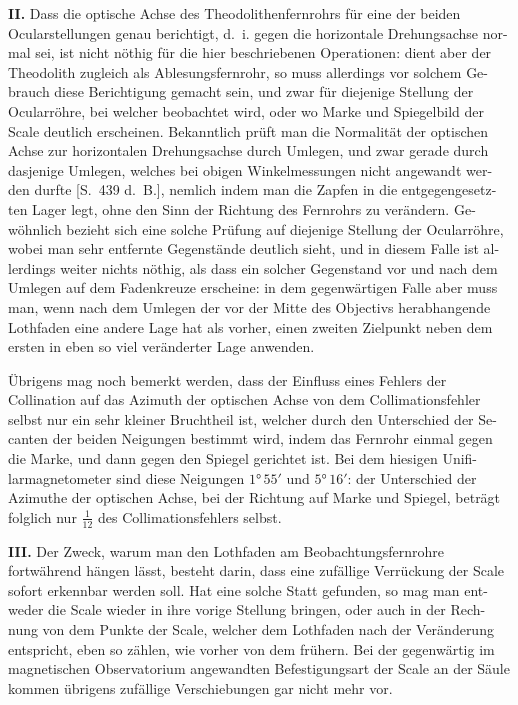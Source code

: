 \documentclass[12pt,a4paper]{article}
\begin{document}
\textbf{II.} Dass die optische Achse des Theodolithenfernrohrs für eine der beiden
Ocularstellungen genau berichtigt, d.~i. gegen die horizontale Drehungsachse nor-
mal sei, ist nicht nöthig für die hier beschriebenen Operationen: dient aber der
Theodolith zugleich als Ablesungsfernrohr, so muss allerdings vor solchem Ge-
brauch diese Berichtigung gemacht sein, und zwar für diejenige Stellung der
Ocularröhre, bei welcher beobachtet wird, oder wo Marke und Spiegelbild der
Scale deutlich erscheinen. Bekanntlich prüft man die Normalität der optischen
Achse zur horizontalen Drehungsachse durch Umlegen, und zwar gerade durch
dasjenige Umlegen, welches bei obigen Winkelmessungen nicht angewandt wer-
den durfte [S.~439 d.~B.], nemlich indem man die Zapfen in die entgegengesetz-
ten Lager legt, ohne den Sinn der Richtung des Fernrohrs zu verändern. Ge-
wöhnlich bezieht sich eine solche Prüfung auf diejenige Stellung der Ocularröhre,
wobei man sehr entfernte Gegenstände deutlich sieht, und in diesem Falle ist al-
lerdings weiter nichts nöthig, als dass ein solcher Gegenstand vor und nach dem
Umlegen auf dem Fadenkreuze erscheine: in dem gegenwärtigen Falle aber muss
man, wenn nach dem Umlegen der vor der Mitte des Objectivs herabhangende
Lothfaden eine andere Lage hat als vorher, einen zweiten Zielpunkt neben dem
ersten in eben so viel veränderter Lage anwenden.

Übrigens mag noch bemerkt werden, dass der Einfluss eines Fehlers der
Collination auf das Azimuth der optischen Achse von dem Collimationsfehler
selbst nur ein sehr kleiner Bruchtheil ist, welcher durch den Unterschied der Se-
canten der beiden Neigungen bestimmt wird, indem das Fernrohr einmal gegen
die Marke, und dann gegen den Spiegel gerichtet ist. Bei dem hiesigen Unifi-
larmagnetometer sind diese Neigungen $1°\,55'$ und $5°\,16'$: der Unterschied der
Azimuthe der optischen Achse, bei der Richtung auf Marke und Spiegel, beträgt
folglich nur $\frac{1}{12}$ des Collimationsfehlers selbst.

\textbf{III.} Der Zweck, warum man den Lothfaden am Beobachtungsfernrohre
fortwährend hängen lässt, besteht darin, dass eine zufällige Verrückung der Scale
sofort erkennbar werden soll. Hat eine solche Statt gefunden, so mag man ent-
weder die Scale wieder in ihre vorige Stellung bringen, oder auch in der Rech-
nung von dem Punkte der Scale, welcher dem Lothfaden nach der Veränderung
entspricht, eben so zählen, wie vorher von dem frühern. Bei der gegenwärtig
im magnetischen Observatorium angewandten Befestigungsart der Scale an der
Säule kommen übrigens zufällige Verschiebungen gar nicht mehr vor.
\end{document}
